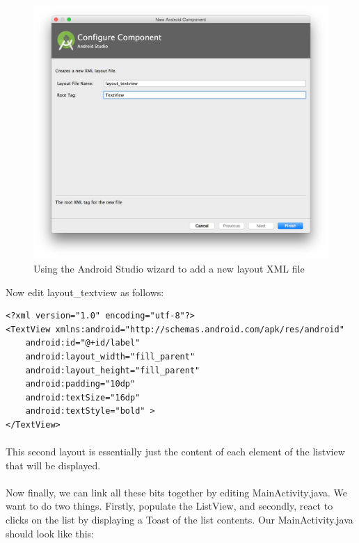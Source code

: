 \begin{figure}[H]
\centering
\includegraphics[width=\textwidth]{images/listview_layout_wizard}
\caption{Using the Android Studio wizard to add a new layout XML file}
\label{fig:listview_layout_wizard}
\end{figure}


Now edit layout\_textview as follows:

\begin{lstlisting}
<?xml version="1.0" encoding="utf-8"?>
<TextView xmlns:android="http://schemas.android.com/apk/res/android"
    android:id="@+id/label"
    android:layout_width="fill_parent"
    android:layout_height="fill_parent"
    android:padding="10dp"
    android:textSize="16dp"
    android:textStyle="bold" >
</TextView>
\end{lstlisting}

\paragraph{} This second layout is essentially just the content of each element of the listview that will be displayed. 

\paragraph{} Now finally, we can link all these bits together by editing MainActivity.java. We want to do two things. Firstly, populate the ListView, and secondly, react to clicks on the list by displaying a Toast of the list contents. Our MainActivity.java should look like this:

